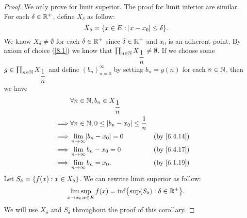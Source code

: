 \begin{proof}
  We only prove for limit superior.
  The proof for limit inferior are similar.
  For each \(\delta \in \mathbb{R}^+\), define \(X_{\delta}\) as follow:
  \[
    X_{\delta} = \set{x \in E : \abs{x - x_0} \leq \delta}.
  \]
  We know \(X_{\delta} \neq \emptyset\) for each \(\delta \in \mathbb{R}^+\) since \(\delta \in \mathbb{R}^+\) and \(x_0\) is an adherent point.
  By axiom of choice (\cref{8.1}) we know that \(\prod_{n \in \mathbb{N}} X_{\dfrac{1}{n}} \neq \emptyset\).
  If we choose some \(g \in \prod_{n \in \mathbb{N}} X_{\dfrac{1}{n}}\) and define \((b_n)_{n = 0}^\infty\) by setting \(b_n = g(n)\) for each \(n \in \mathbb{N}\), then we have
  \begin{align*}
             & \forall n \in \N, b_n \in X_{\dfrac{1}{n}}                                  \\
    \implies & \forall n \in \N, 0 \leq \abs{b_n - x_0} \leq \dfrac{1}{n}                  \\
    \implies & \lim_{n \to \infty} \abs{b_n - x_0} = 0                    &  & \by{6.4.14} \\
    \implies & \lim_{n \to \infty} b_n - x_0 = 0                          &  & \by{6.4.17} \\
    \implies & \lim_{n \to \infty} b_n = x_0.                             &  & \by{6.1.19}
  \end{align*}
  Let \(S_{\delta} = \left\lbrace f(x) : x \in X_{\delta}\right\rbrace\).
  We can rewrite limit superior as follow:
  \[
    \limsup_{x \to x_0 ; x \in E} f(x) = \inf\set{\sup(S_\delta) : \delta \in \R^+}.
  \]
  We will use \(X_{\delta}\) and \(S_{\delta}\) throughout the proof of this corollary.


\end{proof}
